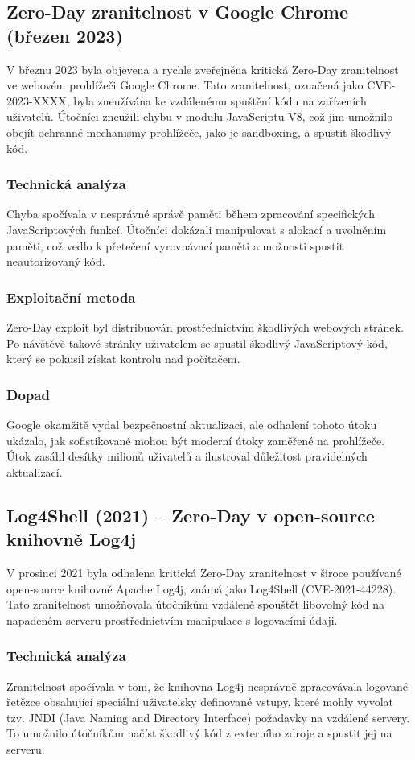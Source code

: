 \documentclass[11pt, conference, a4paper]{IEEEtran}
\begin{document}
\subsection{Zero-Day zranitelnost v Google Chrome (březen 2023)}
V březnu 2023 byla objevena a rychle zveřejněna kritická Zero-Day zranitelnost ve webovém prohlížeči Google Chrome. Tato zranitelnost, označená jako CVE-2023-XXXX, byla zneužívána ke vzdálenému spuštění kódu na zařízeních uživatelů. Útočníci zneužili chybu v modulu JavaScriptu V8, což jim umožnilo obejít ochranné mechanismy prohlížeče, jako je sandboxing, a spustit škodlivý kód.

\subsubsection{Technická analýza} Chyba spočívala v nesprávné správě paměti během zpracování specifických JavaScriptových funkcí. Útočníci dokázali manipulovat s alokací a uvolněním paměti, což vedlo k přetečení vyrovnávací paměti a možnosti spustit neautorizovaný kód.
\subsubsection{Exploitační metoda} Zero-Day exploit byl distribuován prostřednictvím škodlivých webových stránek. Po návštěvě takové stránky uživatelem se spustil škodlivý JavaScriptový kód, který se pokusil získat kontrolu nad počítačem.
\subsubsection{Dopad} Google okamžitě vydal bezpečnostní aktualizaci, ale odhalení tohoto útoku ukázalo, jak sofistikované mohou být moderní útoky zaměřené na prohlížeče. Útok zasáhl desítky milionů uživatelů a ilustroval důležitost pravidelných aktualizací.
\subsection{Log4Shell (2021) – Zero-Day v open-source knihovně Log4j}
V prosinci 2021 byla odhalena kritická Zero-Day zranitelnost v široce používané open-source knihovně Apache Log4j, známá jako Log4Shell (CVE-2021-44228). Tato zranitelnost umožňovala útočníkům vzdáleně spouštět libovolný kód na napadeném serveru prostřednictvím manipulace s logovacími údaji.

\subsubsection{Technická analýza} Zranitelnost spočívala v tom, že knihovna Log4j nesprávně zpracovávala logované řetězce obsahující speciální uživatelsky definované vstupy, které mohly vyvolat tzv. JNDI (Java Naming and Directory Interface) požadavky na vzdálené servery. To umožnilo útočníkům načíst škodlivý kód z externího zdroje a spustit jej na serveru.
\end{document}
